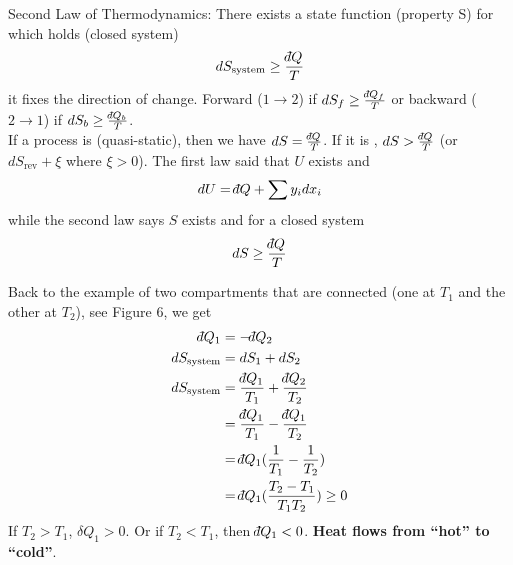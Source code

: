 \documentclass[12pt]{article}
\def\dbar{{\mathchar'26\mkern-12mu d}}
\begin{document}
Second Law of Thermodynamics:  There exists a state function (property S) for which holds (closed system)
\begin{equation}
dS_\text{system} \geq \frac{\dbar Q}{T}
\end{equation}
it fixes the direction of change.  Forward ($1\rightarrow 2$) if $dS_f \geq \frac{\dbar Q_f}{T}$ or backward ($2\rightarrow 1$) if $dS_b \geq \frac{\dbar Q_b}{T}$.\\

If a process is  (quasi-static), then we have $dS = \frac{\dbar Q}{T}$.  If it is , $dS > \frac{\dbar Q}{T}$ (or $dS_\text{rev} + \xi$ where $\xi >0$).  The first law said that $U$ exists and
\begin{equation}
dU = \dbar Q + \sum y_i dx_i
\end{equation}
while the second law says $S$ exists and for a closed system
\begin{equation}
dS \geq \frac{\dbar Q}{T}
\end{equation}

Back to the example of two compartments that are connected (one at $T_1$ and the other at $T_2$), see Figure 6, we get
\begin{align*}
\dbar Q_1 &= -\dbar Q_2\\
dS_\text{system} &= dS_1 + dS_2\\
dS_\text{system} &= \frac{\dbar Q_1}{T_1} + \frac{\dbar Q_2}{T_2}\\
&= \frac{\dbar Q_1}{T_1} - \frac{\dbar Q_1}{T_2}\\
&= \dbar Q_1 (\frac{1}{T_1} - \frac{1}{T_2})\\
&= \dbar Q_1 (\frac{T_2 - T_1}{T_1 T_2}) \geq 0\\
\end{align*}
If $T_2 > T_1$, $\delta Q_1 > 0$.  Or if $T_2 < T_1$, then $\dbar Q_1 < 0$.  \textbf{Heat flows from ``hot'' to ``cold''}.

\end{document}
